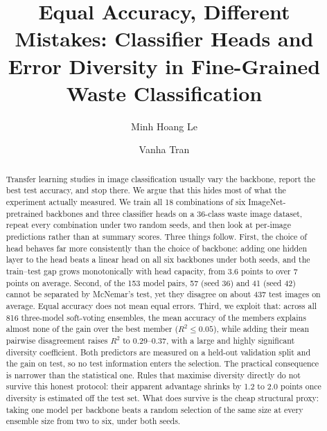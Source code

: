 \documentclass[runningheads]{llncs}
\begin{document}
\title{Equal Accuracy, Different Mistakes: Classifier Heads and\\Error
Diversity in Fine-Grained Waste Classification}


\author{Minh Hoang Le \and Vanha Tran}

\maketitle

\begin{abstract}
Transfer learning studies in image classification usually vary the backbone,
report the best test accuracy, and stop there. We argue that this hides most of
what the experiment actually measured. We train all 18 combinations of six
ImageNet-pretrained backbones and three classifier heads on a 36-class waste
image dataset, repeat every combination under two random seeds, and then look
at per-image predictions rather than at summary scores. Three things follow.
First, the choice of head behaves far more consistently than the choice of
backbone: adding one hidden layer to the head beats a linear head on all six
backbones under both seeds, and the
train--test gap grows monotonically with head capacity, from 3.6 points to over
7 points on average. Second, of the 153 model pairs, 57 (seed 36) and 41 (seed
42) cannot be separated by McNemar's test, yet they disagree on about 437 test
images on average.
Equal accuracy does not mean equal errors. Third, we exploit that: across all
816 three-model soft-voting ensembles, the mean accuracy of the members
explains almost none of the gain over the best member ($R^2 \le 0.05$), while
adding their mean pairwise disagreement raises $R^2$ to 0.29--0.37, with a large and
highly significant diversity coefficient. Both predictors are measured on a
held-out validation split and the gain on test, so no test information enters
the selection. The practical consequence is narrower than the statistical one.
Rules that maximise diversity directly do not survive this honest protocol:
their apparent advantage shrinks by 1.2 to 2.0 points once diversity is
estimated off the test set. What does survive is the cheap structural proxy: taking one model per backbone
beats a random selection of the same size at every ensemble size from two to
six, under both seeds.

\end{abstract}
\end{document}
